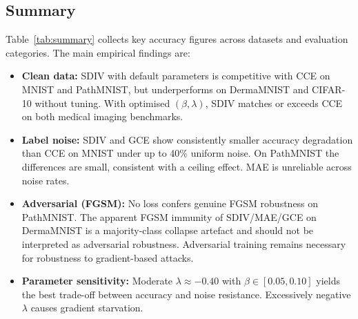 \subsection{Summary}
\label{sec:exp_summary}

Table~\ref{tab:summary} collects key accuracy figures across datasets and
evaluation categories.
The main empirical findings are:
\begin{itemize}[leftmargin=*,itemsep=2pt]
  \item \textbf{Clean data:} SDIV with default parameters is competitive
        with CCE on MNIST and PathMNIST, but underperforms on DermaMNIST
        and CIFAR-10 without tuning. With optimised $(\beta,\lambda)$,
        SDIV matches or exceeds CCE on both medical imaging benchmarks.

  \item \textbf{Label noise:} SDIV and GCE show consistently smaller
        accuracy degradation than CCE on MNIST under up to 40\% uniform
        noise. On PathMNIST the differences are small, consistent with
        a ceiling effect. MAE is unreliable across noise rates.

  \item \textbf{Adversarial (FGSM):} No loss confers genuine FGSM
        robustness on PathMNIST. The apparent FGSM immunity of SDIV/MAE/GCE
        on DermaMNIST is a majority-class collapse artefact and should
        not be interpreted as adversarial robustness. Adversarial training
        remains necessary for robustness to gradient-based attacks.

  \item \textbf{Parameter sensitivity:} Moderate $\lambda \approx -0.40$
        with $\beta \in [0.05, 0.10]$ yields the best trade-off between
        accuracy and noise resistance. Excessively negative $\lambda$
        causes gradient starvation.
\end{itemize}
